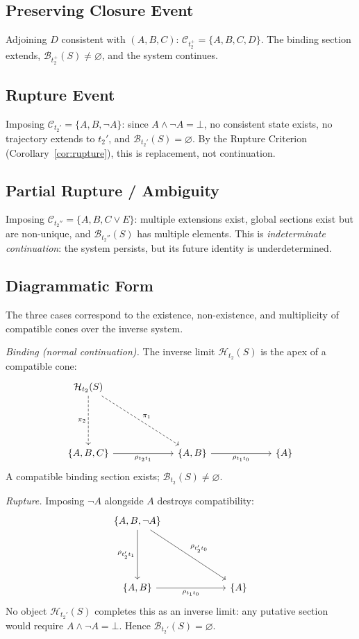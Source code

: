 \documentclass[11pt, letterpaper]{article}
\theoremstyle{plain}
\theoremstyle{definition}
\theoremstyle{remark}
\newcommand{\BI}{\mathcal{B}}
\newcommand{\CC}{\mathcal{C}}
\newcommand{\HH}{\mathcal{H}}
\begin{document}
\subsection{Preserving Closure Event}

Adjoining $D$ consistent with $(A,B,C)$: $\CC_{t_2^+} = \{A,B,C,D\}$. The binding
section extends, $\BI_{t_2^+}(S) \neq \varnothing$, and the system continues.

\subsection{Rupture Event}

Imposing $\CC_{t_2'} = \{A, B, \lnot A\}$: since $A \wedge \lnot A = \bot$, no
consistent state exists, no trajectory extends to $t_2'$, and $\BI_{t_2'}(S) =
\varnothing$. By the Rupture Criterion (Corollary~\ref{cor:rupture}), this is
replacement, not continuation.

\subsection{Partial Rupture / Ambiguity}

Imposing $\CC_{t_2''} = \{A, B, C \vee E\}$: multiple extensions exist, global
sections exist but are non-unique, and $\BI_{t_2''}(S)$ has multiple elements.
This is \emph{indeterminate continuation}: the system persists, but its future identity
is underdetermined.

\subsection{Diagrammatic Form}

The three cases correspond to the existence, non-existence, and multiplicity of
compatible cones over the inverse system.

\medskip
\noindent\textit{Binding (normal continuation).} The inverse limit
$\HH_{t_2}(S)$ is the apex of a compatible cone:
\[
\begin{tikzcd}[column sep=2.2cm, row sep=1.8cm]
  \HH_{t_2}(S)
    \arrow[d, dashed, "\pi_2"']
    \arrow[dr, dashed, "\pi_1"]
  & \\
  \{A,B,C\}
    \arrow[r, "\rho_{t_2 t_1}"']
  & \{A,B\}
    \arrow[r, "\rho_{t_1 t_0}"']
  & \{A\}
\end{tikzcd}
\]
A compatible binding section exists; $\BI_{t_2}(S) \neq \varnothing$.

\medskip
\noindent\textit{Rupture.} Imposing $\lnot A$ alongside $A$ destroys compatibility:
\[
\begin{tikzcd}[column sep=2.2cm, row sep=1.8cm]
  \{A,B,\lnot A\}
    \arrow[d, "\rho_{t_2' t_1}"']
    \arrow[dr, "\rho_{t_2' t_0}"]
  & \\
  \{A,B\}
    \arrow[r, "\rho_{t_1 t_0}"']
  & \{A\}
\end{tikzcd}
\]
No object $\HH_{t_2'}(S)$ completes this as an inverse limit: any putative section
would require $A \wedge \lnot A = \bot$. Hence $\BI_{t_2'}(S) = \varnothing$.
\end{document}
